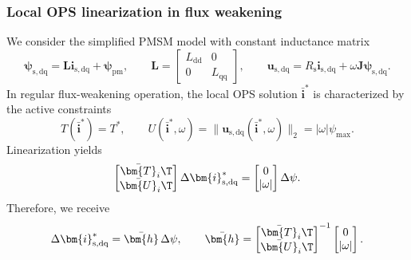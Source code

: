 \begin{frame}
    \frametitle{Local OPS linearization in flux weakening}
    We consider the simplified PMSM model with constant inductance matrix
    \begin{equation}
        \bm{\psi}_{\mathrm{s,dq}} = \bm{L}\bm{i}_{\mathrm{s,dq}} + \bm{\psi}_{\mathrm{pm}},
        \qquad
        \bm{L} =
        \begin{bmatrix}
            L_{\mathrm{dd}} & 0               \\
            0               & L_{\mathrm{qq}}
        \end{bmatrix},
        \qquad
        \bm{u}_{\mathrm{s,dq}} = R_{\mathrm{s}}\bm{i}_{\mathrm{s,dq}} + \omega\bm{J}\bm{\psi}_{\mathrm{s,dq}} .
    \end{equation}
    In regular flux-weakening operation, the local OPS solution $\bar{\bm{i}}^*$ is characterized by the active constraints
    \begin{equation}
        T(\bar{\bm{i}}^*) = T^*,
        \qquad
        U(\bar{\bm{i}}^*,\omega) = \|\bm{u}_{\mathrm{s,dq}}(\bar{\bm{i}}^*,\omega)\|_2 = |\omega|\psi_{\max} .
    \end{equation}
    Linearization yields
    \begin{equation}
        \begin{bmatrix}
            \bar{\bm{T}}_i\T \\
            \bar{\bm{U}}_i\T
        \end{bmatrix}
        \Delta \bm{i}_{\mathrm{s,dq}}^*
        =
        \begin{bmatrix}
            0 \\
            |\omega|
        \end{bmatrix}
        \Delta \psi .
    \end{equation}
    Therefore, we receive
    \begin{equation}
        \Delta \bm{i}_{\mathrm{s,dq}}^* = \bar{\bm{h}}\,\Delta \psi,
        \qquad
        \bar{\bm{h}} =
        \begin{bmatrix}
            \bar{\bm{T}}_i\T \\
            \bar{\bm{U}}_i\T
        \end{bmatrix}^{-1}
        \begin{bmatrix}
            0 \\
            |\omega|
        \end{bmatrix} .
    \end{equation}
\end{frame}

